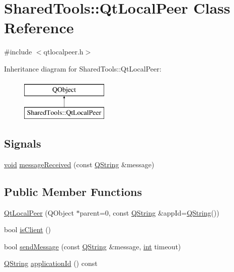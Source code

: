 \hypertarget{class_shared_tools_1_1_qt_local_peer}{\section{Shared\-Tools\-:\-:Qt\-Local\-Peer Class Reference}
\label{class_shared_tools_1_1_qt_local_peer}
}


{\ttfamily \#include $<$qtlocalpeer.\-h$>$}

Inheritance diagram for Shared\-Tools\-:\-:Qt\-Local\-Peer\-:\begin{figure}[H]
\begin{center}
\leavevmode
\includegraphics[height=2.000000cm]{class_shared_tools_1_1_qt_local_peer}
\end{center}
\end{figure}
\subsection*{Signals}
\begin{DoxyCompactItemize}
\item 
\hyperlink{group___u_a_v_objects_plugin_ga444cf2ff3f0ecbe028adce838d373f5c}{void} \hyperlink{class_shared_tools_1_1_qt_local_peer_ae006c8312932d88664a5bac96979a188}{message\-Received} (const \hyperlink{group___u_a_v_objects_plugin_gab9d252f49c333c94a72f97ce3105a32d}{Q\-String} \&message)
\end{DoxyCompactItemize}
\subsection*{Public Member Functions}
\begin{DoxyCompactItemize}
\item 
\hyperlink{class_shared_tools_1_1_qt_local_peer_a44d1ea10f2f5b6ef4f06d8e942f74498}{Qt\-Local\-Peer} (Q\-Object $\ast$parent=0, const \hyperlink{group___u_a_v_objects_plugin_gab9d252f49c333c94a72f97ce3105a32d}{Q\-String} \&app\-Id=\hyperlink{group___u_a_v_objects_plugin_gab9d252f49c333c94a72f97ce3105a32d}{Q\-String}())
\item 
bool \hyperlink{class_shared_tools_1_1_qt_local_peer_abde913531a6e149d613ad15eec0156d7}{is\-Client} ()
\item 
bool \hyperlink{class_shared_tools_1_1_qt_local_peer_a04dd7346b19a80c6f459ac606b4335de}{send\-Message} (const \hyperlink{group___u_a_v_objects_plugin_gab9d252f49c333c94a72f97ce3105a32d}{Q\-String} \&message, \hyperlink{ioapi_8h_a787fa3cf048117ba7123753c1e74fcd6}{int} timeout)
\item 
\hyperlink{group___u_a_v_objects_plugin_gab9d252f49c333c94a72f97ce3105a32d}{Q\-String} \hyperlink{class_shared_tools_1_1_qt_local_peer_acc4e6c233ed6f080bcf102a14d961f5d}{application\-Id} () const 
\end{DoxyCompactItemize}
